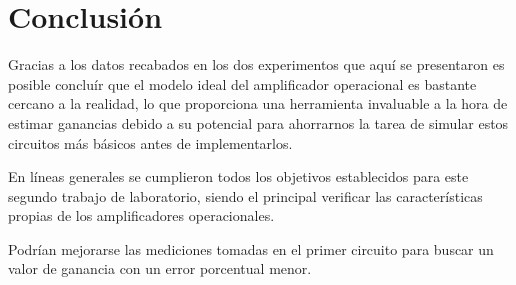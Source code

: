 \section{Conclusión}

Gracias a los datos recabados en los dos experimentos que aquí se presentaron
es posible concluír que el modelo ideal del amplificador operacional es 
bastante cercano a la realidad, lo que proporciona una herramienta invaluable
a la hora de estimar ganancias debido a su potencial para ahorrarnos la tarea
de simular estos circuitos más básicos antes de implementarlos.

En líneas generales se cumplieron todos los objetivos establecidos para este
segundo trabajo de laboratorio, siendo el principal verificar las 
características propias de los amplificadores operacionales.

Podrían mejorarse las mediciones tomadas en el primer circuito para buscar
un valor de ganancia con un error porcentual menor.
